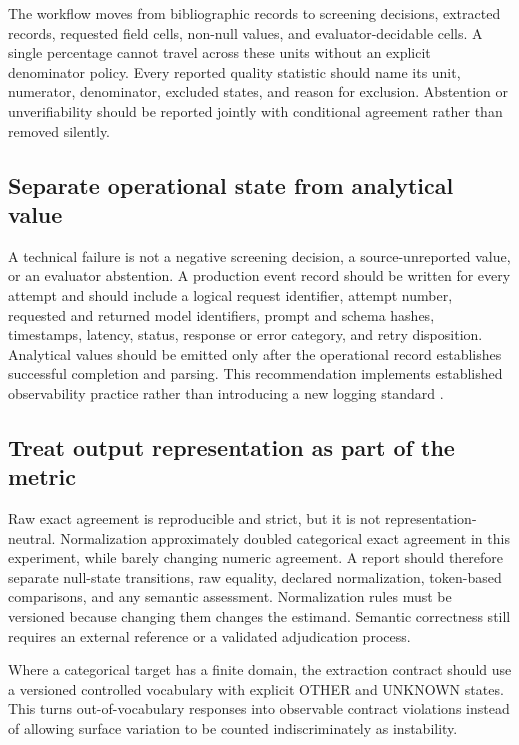 \documentclass[acmsmall,anonymous,review]{acmart}
\begin{document}
The workflow moves from bibliographic records to screening decisions, extracted records, requested field cells, non-null values, and evaluator-decidable cells. A single percentage cannot travel across these units without an explicit denominator policy. Every reported quality statistic should name its unit, numerator, denominator, excluded states, and reason for exclusion. Abstention or unverifiability should be reported jointly with conditional agreement rather than removed silently.

\subsection{Separate operational state from analytical value}

A technical failure is not a negative screening decision, a source-unreported value, or an evaluator abstention. A production event record should be written for every attempt and should include a logical request identifier, attempt number, requested and returned model identifiers, prompt and schema hashes, timestamps, latency, status, response or error category, and retry disposition. Analytical values should be emitted only after the operational record establishes successful completion and parsing. This recommendation implements established observability practice rather than introducing a new logging standard \cite{sre2016monitoring,otel2025genai}.

\subsection{Treat output representation as part of the metric}

Raw exact agreement is reproducible and strict, but it is not representation-neutral. Normalization approximately doubled categorical exact agreement in this experiment, while barely changing numeric agreement. A report should therefore separate null-state transitions, raw equality, declared normalization, token-based comparisons, and any semantic assessment. Normalization rules must be versioned because changing them changes the estimand. Semantic correctness still requires an external reference or a validated adjudication process.

Where a categorical target has a finite domain, the extraction contract should use a versioned controlled vocabulary with explicit OTHER and UNKNOWN states. This turns out-of-vocabulary responses into observable contract violations instead of allowing surface variation to be counted indiscriminately as instability.
\end{document}
